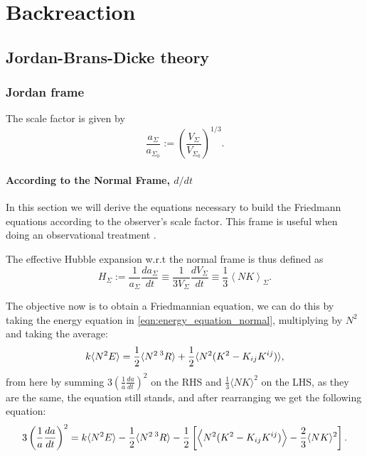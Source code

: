 \chapter{Backreaction}


\section{Jordan-Brans-Dicke theory}

\subsection{Jordan frame}

The scale factor is given by
\begin{equation}
    \frac{a_\Sigma}{a_{\Sigma_0}}:=\left(\frac{V_\Sigma}{V_{\Sigma_0}}\right)^{1/3}.
\end{equation}


\subsubsection{According to the Normal Frame, $d/dt$}

In this section we will derive the equations necessary to build the Friedmann equations according to the observer's scale factor.
This frame is useful when doing an observational treatment \cite{Gasperini_2010}.

The effective Hubble expansion w.r.t the normal frame is thus defined as
\begin{equation}
    H_{\Sigma} := \frac{1}{a_{\Sigma}}\frac{da_{\Sigma}}{dt}\equiv \frac{1}{3V_{\Sigma}}\frac{dV_{\Sigma}}{dt}\equiv\frac{1}{3}\left\langle NK \right\rangle_{\Sigma}.
    \label{eqn:def_scale_factor_normal}
\end{equation}


The objective now is to obtain a Friedmannian equation, we can do this by taking the energy equation in \cref{eqn:energy_equation_normal}, multiplying by $N^2$ and taking the average:
\begin{equation}
    k\langle N^2E\rangle=\frac{1}{2}\langle N^2\prescript{3}{}{R}\rangle+\frac{1}{2}\langle N^2(K^2-K_{ij}K^{ij})\rangle,
\end{equation}
from here by summing $3\left(\frac{1}{a}\frac{da}{dt}\right)^2$ on the RHS and $\frac{1}{3}\langle NK\rangle^2$ on the LHS, as they are the same, the equation still stands, and after rearranging we get the following equation:
\begin{equation}
    3\left(\frac{1}{a}\frac{da}{dt}\right)^2=k\langle N^2E\rangle-\frac{1}{2}\langle N^2\prescript{3}{}{R}\rangle-\frac{1}{2}\left[\left\langle N^2(K^2-K_{ij}K^{ij})\right\rangle-\frac{2}{3}\langle NK\rangle^2\right].
\end{equation}



